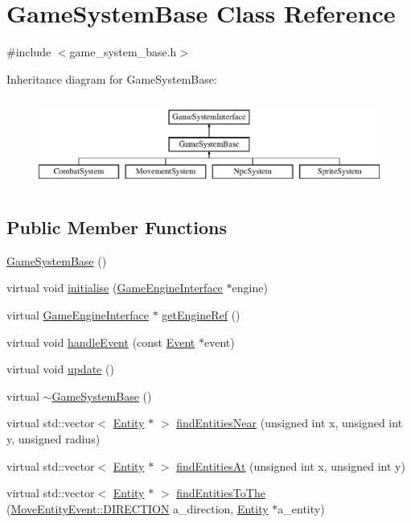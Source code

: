 \hypertarget{classGameSystemBase}{\section{Game\-System\-Base Class Reference}
\label{classGameSystemBase}
}


{\ttfamily \#include $<$game\-\_\-system\-\_\-base.\-h$>$}

Inheritance diagram for Game\-System\-Base\-:\begin{figure}[H]
\begin{center}
\leavevmode
\includegraphics[height=2.957747cm]{classGameSystemBase}
\end{center}
\end{figure}
\subsection*{Public Member Functions}
\begin{DoxyCompactItemize}
\item 
\hyperlink{classGameSystemBase_a328ace5c41637f72e450083ce7159f66}{Game\-System\-Base} ()
\item 
virtual void \hyperlink{classGameSystemBase_a55b4fc27cbfccd3c724c2e5984d78625}{initialise} (\hyperlink{classGameEngineInterface}{Game\-Engine\-Interface} $\ast$engine)
\item 
virtual \hyperlink{classGameEngineInterface}{Game\-Engine\-Interface} $\ast$ \hyperlink{classGameSystemBase_a1954c5a1c79963554805bc25b2cd6072}{get\-Engine\-Ref} ()
\item 
virtual void \hyperlink{classGameSystemBase_a007b3ece290b1ad0dc3e397c5264d44d}{handle\-Event} (const \hyperlink{classEvent}{Event} $\ast$event)
\item 
virtual void \hyperlink{classGameSystemBase_a039d3086ac7fe50abdb110b569520d69}{update} ()
\item 
virtual \hyperlink{classGameSystemBase_a96f76df170673523b71d6c1dab8a7efd}{$\sim$\-Game\-System\-Base} ()
\item 
virtual std\-::vector$<$ \hyperlink{classEntity}{Entity} $\ast$ $>$ \hyperlink{classGameSystemBase_aae270a88f1077a091e6033514b889abd}{find\-Entities\-Near} (unsigned int x, unsigned int y, unsigned radius)
\item 
virtual std\-::vector$<$ \hyperlink{classEntity}{Entity} $\ast$ $>$ \hyperlink{classGameSystemBase_a7aa9912fc078d990dbfb480e411bd3bc}{find\-Entities\-At} (unsigned int x, unsigned int y)
\item 
virtual std\-::vector$<$ \hyperlink{classEntity}{Entity} $\ast$ $>$ \hyperlink{classGameSystemBase_a44456ef40ac565b9d6b65f3b1531a4ef}{find\-Entities\-To\-The} (\hyperlink{classMoveEntityEvent_a7058a943643bee9164a21e62e3392807}{Move\-Entity\-Event\-::\-D\-I\-R\-E\-C\-T\-I\-O\-N} a\-\_\-direction, \hyperlink{classEntity}{Entity} $\ast$a\-\_\-entity)
\end{DoxyCompactItemize}
